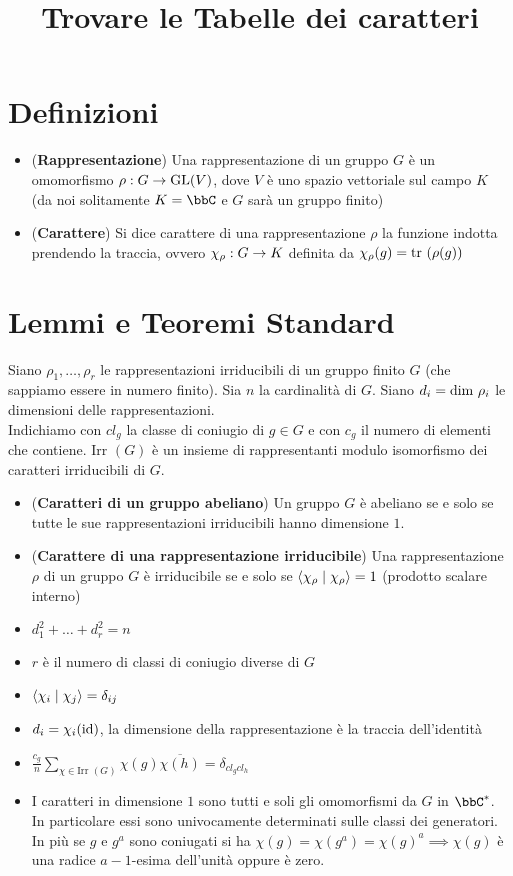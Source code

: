 \documentclass[a4paper,NoNotes,GeneralMath]{stdmdoc}
\newcommand{\Irr}{\text{Irr }}
\begin{document}
	\title{Trovare le Tabelle dei caratteri}

	\section{Definizioni}
	\begin{itemize}
		\item ({\bf Rappresentazione}) Una rappresentazione di un gruppo $G$ è un omomorfismo $\rho: G \rightarrow \mbox{GL} (V)$, dove $V$ è uno spazio vettoriale sul campo $K$ (da noi solitamente $K = \bbC$ e $G$ sarà un gruppo finito)
		\item ({\bf Carattere}) Si dice carattere di una rappresentazione $\rho$ la funzione indotta prendendo la traccia, ovvero $\chi_\rho : G \rightarrow K$ definita da $\chi_\rho (g) = \mbox{tr } (\rho(g))$
	\end{itemize}

	\section{Lemmi e Teoremi Standard}
	Siano $\rho_1, \ldots, \rho_r$ le rappresentazioni irriducibili di un gruppo finito $G$ (che sappiamo essere in numero finito). Sia $n$ la cardinalità di $G$. Siano $d_i = \mbox{dim } \rho_i$ le dimensioni delle rappresentazioni. \\
	Indichiamo con $cl_g$ la classe di coniugio di $g \in G$ e con $c_g$ il numero di elementi che contiene. $\Irr(G)$ è un insieme di rappresentanti modulo isomorfismo dei caratteri irriducibili di $G$.
	\begin{itemize}
		\item ({\bf Caratteri di un gruppo abeliano}) Un gruppo $G$ è abeliano se e solo se tutte le sue rappresentazioni irriducibili hanno dimensione $1$.
		\item ({\bf Carattere di una rappresentazione irriducibile}) Una rappresentazione $\rho$ di un gruppo $G$ è irriducibile se e solo se $\langle \chi_\rho \mid \chi_\rho \rangle = 1$ (prodotto scalare interno)
		\item $d_1^2 + \ldots + d_r^2 = n$
		\item $r$ è il numero di classi di coniugio diverse di $G$
		\item $\langle \chi_i \mid \chi_j \rangle = \delta_{ij}$
		\item $d_i = \chi_i (\mbox{id})$, la dimensione della rappresentazione è la traccia dell'identità
		\item $\frac{c_g}{n} \sum_{\chi \in \Irr(G)} \chi(g)\overline{\chi(h)} = \delta_{cl_g cl_h}$
		\item I caratteri in dimensione $1$ sono tutti e soli gli omomorfismi da $G$ in $\bbC^{*}$. In particolare essi sono univocamente determinati sulle classi dei generatori. In più se $g$ e $g^a$ sono coniugati si ha $\chi(g) = \chi(g^a) = \chi(g)^a \implies \chi(g)$ è una radice $a-1$-esima dell'unità oppure è zero.
	\end{itemize}
\end{document}
